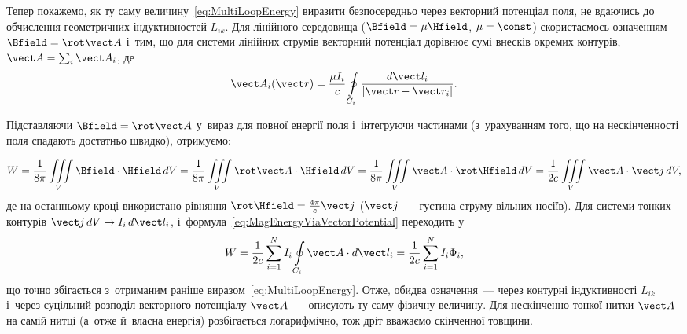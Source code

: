 Тепер покажемо, як ту саму величину~\eqref{eq:MultiLoopEnergy} виразити безпосередньо
через векторний потенціал поля, не вдаючись до обчислення геометричних індуктивностей
$L_{ik}$. Для лінійного середовища ($\Bfield=\mu\Hfield$, $\mu=\const$) скористаємось
означенням $\Bfield=\rot\vect A$ і~тим, що для системи лінійних струмів векторний
потенціал дорівнює сумі внесків окремих контурів, $\vect A=\sum_i\vect A_i$, де
\begin{equation}\label{eq:VectorPotentialLineCurrentSum}
	\vect A_i(\vect r) = \frac{\mu I_i}{c}\oint\limits_{C_i} \frac{d\vect l_i}{|\vect r-\vect r_i|}.
\end{equation}
{  %
Підставляючи $\Bfield=\rot\vect A$ у~вираз для повної енергії поля і~інтегруючи частинами
(з~урахуванням того, що на нескінченності поля спадають достатньо швидко), отримуємо:\par}
\begin{equation}\label{eq:MagEnergyViaVectorPotential}
	W = \frac1{8\pi}\iiint\limits_V \Bfield\cdot\Hfield\,dV
	= \frac1{8\pi}\iiint\limits_V \rot\vect A\cdot\Hfield\,dV
	= \frac1{8\pi}\iiint\limits_V \vect A\cdot\rot\Hfield\,dV
	= \frac1{2c}\iiint\limits_V \vect A\cdot\vect j\,dV,
\end{equation}
де на останньому кроці використано рівняння $\rot\Hfield=\frac{4\pi}{c}\vect j$ ($\vect j$~--- густина струму вільних носіїв). Для
системи тонких контурів $\vect j\,dV\to I_i\,d\vect l_i$,
і~формула~\eqref{eq:MagEnergyViaVectorPotential} переходить у
\begin{equation}\label{eq:MagEnergyLineCurrents}
	W = \frac1{2c}\sum_{i=1}^{N} I_i\oint\limits_{C_i}\vect A\cdot d\vect l_i
	= \frac1{2c}\sum_{i=1}^{N} I_i\Phi_i,
\end{equation}
що точно збігається з~отриманим раніше виразом~\eqref{eq:MultiLoopEnergy}. Отже, обидва
означення~--- через контурні індуктивності $L_{ik}$ і~через суцільний розподіл векторного
потенціалу $\vect A$~--- описують ту саму фізичну величину. Для нескінченно тонкої нитки $\vect A$ на самій нитці (а~отже й~власна енергія) розбігається логарифмічно, тож дріт вважаємо скінченної товщини.


